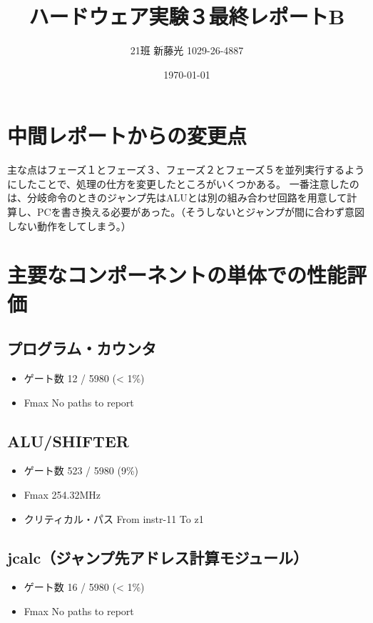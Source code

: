 \documentclass{jarticle}
\author{21班 新藤光 1029-26-4887}
\date{\today}
\title{ハードウェア実験３最終レポートB}
\begin{document}
\maketitle


\section{中間レポートからの変更点}
\label{sec-1}
主な点はフェーズ１とフェーズ３、フェーズ２とフェーズ５を並列実行するようにしたことで、処理の仕方を変更したところがいくつかある。
一番注意したのは、分岐命令のときのジャンプ先はALUとは別の組み合わせ回路を用意して計算し、PCを書き換える必要があった。（そうしないとジャンプが間に合わず意図しない動作をしてしまう。）



\section{主要なコンポーネントの単体での性能評価}
\label{sec-2}
\subsection{プログラム・カウンタ}
\label{sec-2-1}
\begin{itemize}
\item ゲート数 12 / 5980 (< 1\%)
\item Fmax No paths to report
\end{itemize}

\subsection{ALU/SHIFTER}
\label{sec-2-2}
\begin{itemize}
\item ゲート数 523 / 5980 (9\%)
\item Fmax 254.32MHz
\item クリティカル・パス From instr-11 To z1
\end{itemize}

\subsection{jcalc（ジャンプ先アドレス計算モジュール）}
\label{sec-2-3}
\begin{itemize}
\item ゲート数 16 / 5980 (< 1\%)
\item Fmax No paths to report
\end{itemize}
\end{document}
